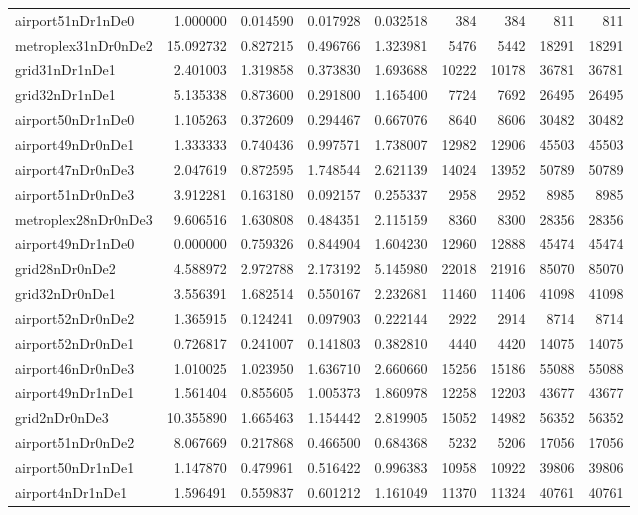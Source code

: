 \begin{longtable}{|l|r|r|r|r|r|r|r|r|}
airport51nDr1nDe0 & 1.000000 & 0.014590 & 0.017928 & 0.032518 & 384 & 384 & 811 & 811 \\
metroplex31nDr0nDe2 & 15.092732 & 0.827215 & 0.496766 & 1.323981 & 5476 & 5442 & 18291 & 18291 \\
grid31nDr1nDe1 & 2.401003 & 1.319858 & 0.373830 & 1.693688 & 10222 & 10178 & 36781 & 36781 \\
grid32nDr1nDe1 & 5.135338 & 0.873600 & 0.291800 & 1.165400 & 7724 & 7692 & 26495 & 26495 \\
airport50nDr1nDe0 & 1.105263 & 0.372609 & 0.294467 & 0.667076 & 8640 & 8606 & 30482 & 30482 \\
airport49nDr0nDe1 & 1.333333 & 0.740436 & 0.997571 & 1.738007 & 12982 & 12906 & 45503 & 45503 \\
airport47nDr0nDe3 & 2.047619 & 0.872595 & 1.748544 & 2.621139 & 14024 & 13952 & 50789 & 50789 \\
airport51nDr0nDe3 & 3.912281 & 0.163180 & 0.092157 & 0.255337 & 2958 & 2952 & 8985 & 8985 \\
metroplex28nDr0nDe3 & 9.606516 & 1.630808 & 0.484351 & 2.115159 & 8360 & 8300 & 28356 & 28356 \\
airport49nDr1nDe0 & 0.000000 & 0.759326 & 0.844904 & 1.604230 & 12960 & 12888 & 45474 & 45474 \\
grid28nDr0nDe2 & 4.588972 & 2.972788 & 2.173192 & 5.145980 & 22018 & 21916 & 85070 & 85070 \\
grid32nDr0nDe1 & 3.556391 & 1.682514 & 0.550167 & 2.232681 & 11460 & 11406 & 41098 & 41098 \\
airport52nDr0nDe2 & 1.365915 & 0.124241 & 0.097903 & 0.222144 & 2922 & 2914 & 8714 & 8714 \\
airport52nDr0nDe1 & 0.726817 & 0.241007 & 0.141803 & 0.382810 & 4440 & 4420 & 14075 & 14075 \\
airport46nDr0nDe3 & 1.010025 & 1.023950 & 1.636710 & 2.660660 & 15256 & 15186 & 55088 & 55088 \\
airport49nDr1nDe1 & 1.561404 & 0.855605 & 1.005373 & 1.860978 & 12258 & 12203 & 43677 & 43677 \\
grid2nDr0nDe3 & 10.355890 & 1.665463 & 1.154442 & 2.819905 & 15052 & 14982 & 56352 & 56352 \\
airport51nDr0nDe2 & 8.067669 & 0.217868 & 0.466500 & 0.684368 & 5232 & 5206 & 17056 & 17056 \\
airport50nDr1nDe1 & 1.147870 & 0.479961 & 0.516422 & 0.996383 & 10958 & 10922 & 39806 & 39806 \\
airport4nDr1nDe1 & 1.596491 & 0.559837 & 0.601212 & 1.161049 & 11370 & 11324 & 40761 & 40761 \\

\end{longtable}
